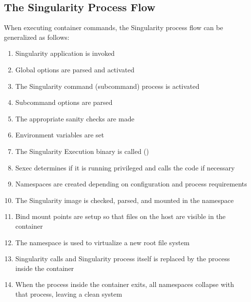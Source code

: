 \documentclass[letterpaper,10pt,english]{sphinxmanual}
\begin{document}
\subsection{The Singularity Process Flow}
\label{\detokenize{introduction:the-singularity-process-flow}}
When executing container commands, the Singularity process flow can be
generalized as follows:
\begin{enumerate}
\item {} 
Singularity application is invoked

\item {} 
Global options are parsed and activated

\item {} 
The Singularity command (subcommand) process is activated

\item {} 
Subcommand options are parsed

\item {} 
The appropriate sanity checks are made

\item {} 
Environment variables are set

\item {} 
The Singularity Execution binary is called ()

\item {} 
Sexec determines if it is running privileged and calls the  code if
necessary

\item {} 
Namespaces are created depending on configuration and process
requirements

\item {} 
The Singularity image is checked, parsed, and mounted in the
namespace

\item {} 
Bind mount points are setup so that files on the host are visible in
the  container

\item {} 
The namespace  is used to virtualize a new root file system

\item {} 
Singularity calls  and Singularity process itself is replaced by the
process inside the container

\item {} 
When the process inside the container exits, all namespaces collapse
with that process, leaving a clean system

\end{enumerate}
\end{document}
